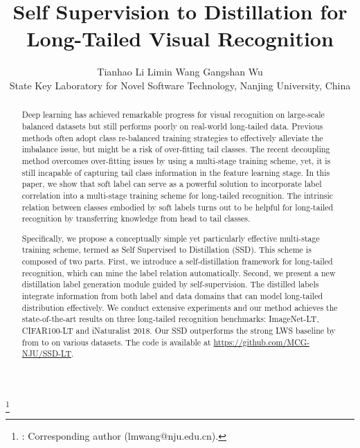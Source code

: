 \documentclass[10pt,twocolumn,letterpaper]{article}
\newcommand\blfootnote[1]{\begingroup
  \renewcommand\thefootnote{}\footnote{#1}\addtocounter{footnote}{-1}\endgroup
}
\begin{document}
\title{Self Supervision to Distillation for Long-Tailed Visual Recognition}

\author{
    Tianhao Li \quad \quad Limin Wang\textsuperscript{\Letter} \quad  \quad Gangshan Wu \\
State Key Laboratory for Novel Software Technology, Nanjing University, China\\
}

\maketitle
\ificcvfinal\thispagestyle{empty}\fi

\begin{abstract}
   Deep learning has achieved remarkable progress for visual recognition on large-scale balanced datasets but still performs poorly on real-world long-tailed data. Previous methods often adopt class re-balanced training strategies to effectively alleviate the imbalance issue, but might be a risk of over-fitting tail classes. The recent decoupling method overcomes over-fitting issues by using a multi-stage training scheme, yet, it is still incapable of capturing tail class information in the feature learning stage. In this paper, we show that soft label can serve as a powerful solution to incorporate label correlation into a multi-stage training scheme for long-tailed recognition. The intrinsic relation between classes embodied by soft labels turns out to be helpful for long-tailed recognition by transferring knowledge from head to tail classes.

   Specifically, we propose a conceptually simple yet particularly effective multi-stage training scheme, termed as Self Supervised to Distillation (SSD). This scheme is composed of two parts. First, we introduce a self-distillation framework for long-tailed recognition, which can mine the label relation automatically. Second, we present a new distillation label generation module guided by self-supervision. The distilled labels integrate information from both label and data domains that can model long-tailed distribution effectively. We conduct extensive experiments and our method achieves the state-of-the-art results on three long-tailed recognition benchmarks: ImageNet-LT, CIFAR100-LT and iNaturalist 2018. Our SSD outperforms the strong LWS baseline by from  to  on various datasets. The code is available at \url{https://github.com/MCG-NJU/SSD-LT}.
\end{abstract}
\blfootnote{ \Letter: Corresponding author (lmwang@nju.edu.cn).}
\end{document}
